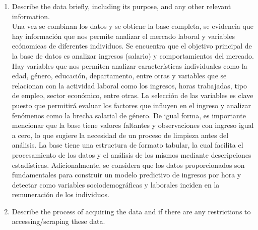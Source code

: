 \documentclass[12pt,a4paper,onecolumn]{article}
\begin{document}
\begin{enumerate}
\begin{enumerate}
    \item Describe the data briefly, including its purpose, and any other relevant information. \\
    Una vez se combinan los datos y se obtiene la base completa, se evidencia que hay informaci\'on que nos permite analizar el mercado laboral y variables ec\'onomicas de diferentes individuos. Se encuentra que el objetivo principal de la base de datos es analizar ingresos (salario) y comportamientos del mercado. Hay variables que nos permiten analizar caracter\'isticas individuales como la edad, g\'enero, educaci\'on, departamento, entre otras y variables que se relacionan con la actividad laboral como los ingresos, horas trabajadas, tipo de empleo, sector econ\'omico, entre otras. La selecci\'on de las variables es clave puesto que permitir\'a evaluar los factores que influyen en el ingreso y analizar fen\'omenos como la brecha salarial de g\'enero. De igual forma, es importante mencionar que la base tiene valores faltantes y observaciones con ingreso igual a cero, lo que sugiere la necesidad de un proceso de limpieza antes del an\'alisis. La base tiene una estructura de formato tabular, la cual facilita el procesamiento de los datos y el an\'alisis de los mismos mediante descripciones estad\'isticas. Adicionalmente, se considera que los datos proporcionados son fundamentales para construir un modelo predictivo de ingresos por hora y detectar como variables sociodemogr\'aficas y laborales inciden en la remuneraci\'on de los individuos.

    









    
    \item Describe the process of acquiring the data and if there are any restrictions to accessing/scraping these data. \\
    

\end{enumerate}
\end{enumerate}
\end{document}
